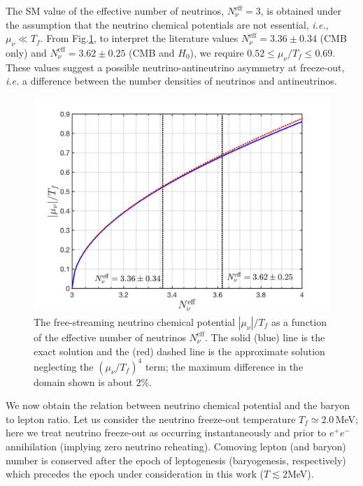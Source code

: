 The SM value of the effective number of neutrinos, $N_\nu^{\mathrm{eff}}=3$, is obtained under the assumption that the neutrino chemical potentials are not essential, {\it i.e.\/}, $\mu_\nu\ll T_f$. From Fig.\;\ref{Chemical_Potential_Neff}, to interpret the literature values $N_\nu^{\mathrm{eff}}=3.36\pm0.34$ (CMB only) and $N_\nu^{\mathrm{eff}}= 3.62\pm0.25$ (CMB and $H_0$), we require $0.52\leqslant\mu_\nu/T_f\leqslant0.69$. These values suggest  a possible neutrino-antineutrino asymmetry at freeze-out, {\it i.e.\/} a difference between the number densities of neutrinos and antineutrinos.

\begin{figure}[t]
\begin{center}
\includegraphics[width=0.9\linewidth]{./plots/Chemical_Potential_Neff}
\caption{The free-streaming neutrino chemical potential $|\mu_\nu|/T_f$ as a function of the effective number of neutrinos $N_\nu^{\mathrm{eff}}$. The solid (blue) line is the exact solution and the (red) dashed line is the approximate solution neglecting the $(\mu_\nu/T_f)^4$ term; the maximum difference in the domain shown is about $2\%$. }
\label{Chemical_Potential_Neff}
\end{center}
\end{figure}



We now obtain the relation between neutrino chemical potential and the baryon to lepton ratio. Let us consider the neutrino freeze-out temperature $T_f\simeq 2.0$\,MeV; here we treat neutrino freeze-out as occurring instantaneously and prior to $e^+e^-$ annihilation (implying zero neutrino reheating). Comoving lepton (and baryon) number is conserved after the epoch of leptogenesis (baryogenesis, respectively) which precedes the epoch  under consideration in this work ($T\lesssim 2$\;MeV). %

